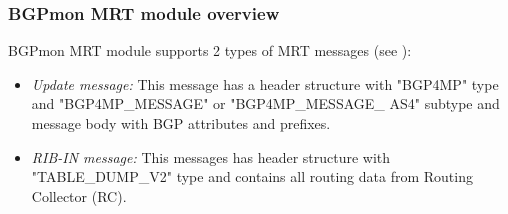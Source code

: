 



 





\subsubsection{BGPmon MRT module overview}
BGPmon MRT module supports 2 types of MRT messages (see \cite{mrt}):
\begin{itemize}
\item{\emph{Update message:} This message has a header structure with "BGP4MP" type and "BGP4MP\_MESSAGE" or "BGP4MP\_MESSAGE\_ AS4" subtype and message body with  BGP attributes and prefixes. }
\item{\emph{RIB-IN message:} This messages has header structure with "TABLE\_DUMP\_V2" type and contains all routing data from Routing Collector (RC).}
\end{itemize}


